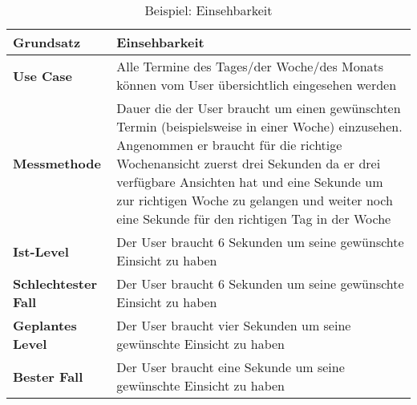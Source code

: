 \begin{table}[h!]
    \begin{tabular}{|p{4cm}|p{11cm}|}
        \hline
      \textbf{Grundsatz}  & Einsehbarkeit \\
      \hline
      \textbf{Use Case}           &    Alle Termine des Tages/der Woche/des Monats können vom User übersichtlich eingesehen werden \\
      \textbf{Messmethode}     &      Dauer die der User braucht um einen gewünschten Termin (beispielsweise in einer Woche) einzusehen.      
                                    Angenommen er braucht für die richtige Wochenansicht zuerst drei Sekunden da er drei verfügbare Ansichten hat und 
                                    eine Sekunde um zur richtigen Woche zu gelangen und weiter noch eine Sekunde für den richtigen Tag in der Woche \\
      
      \textbf{Ist-Level}        &      Der User braucht 6 Sekunden um seine gewünschte Einsicht zu haben       \\
      
      \textbf{Schlechtester Fall}    &       Der User braucht 6 Sekunden um seine gewünschte Einsicht zu haben      \\
      
      \textbf{Geplantes Level}     &       Der User braucht vier Sekunden um seine gewünschte Einsicht zu haben        \\
      
      \textbf{Bester Fall}           &      Der User braucht eine Sekunde um seine gewünschte Einsicht zu haben      \\
      \hline
    \end{tabular}

    \caption{Beispiel: Einsehbarkeit}
    \label{tbl:einsehbarkeit}

  \end{table}
